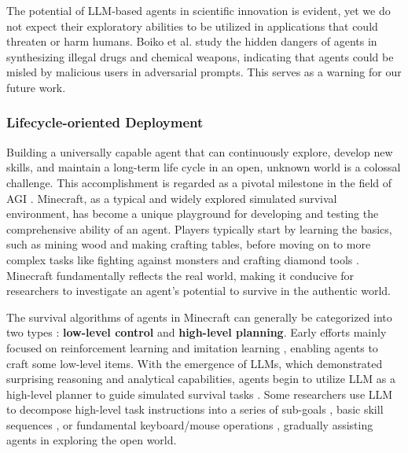 The potential of LLM-based agents in scientific innovation is evident, yet we do not expect their exploratory abilities to be utilized in applications that could threaten or harm humans. Boiko et al. \cite{DBLP:journals/corr/abs-2304-05332} study the hidden dangers of agents in synthesizing illegal drugs and chemical weapons, indicating that agents could be misled by malicious users in adversarial prompts. This serves as a warning for our future work.

\subsubsection{Lifecycle-oriented Deployment}\label{sec:Lifecycle-Oriented Deployment}
Building a universally capable agent that can continuously explore, develop new skills, and maintain a long-term life cycle in an open, unknown world is a colossal challenge. This accomplishment is regarded as a pivotal milestone in the field of AGI \cite{DBLP:journals/corr/abs-2302-01560}. Minecraft, as a typical and widely explored simulated survival environment, has become a unique playground for developing and testing the comprehensive ability of an agent. Players typically start by learning the basics, such as mining wood and making crafting tables, before moving on to more complex tasks like fighting against monsters and crafting diamond tools \cite{DBLP:journals/corr/abs-2305-16291}. Minecraft fundamentally reflects the real world, making it conducive for researchers to investigate an agent's potential to survive in the authentic world.

The survival algorithms of agents in Minecraft can generally be categorized into two types \cite{DBLP:journals/corr/abs-2305-16291}: \textbf{low-level control} and \textbf{high-level planning}. Early efforts mainly focused on reinforcement learning \cite{DBLP:journals/corr/abs-2305-16291, DBLP:journals/corr/abs-2211-00688} and imitation learning \cite{DBLP:journals/corr/abs-2007-02701}, enabling agents to craft some low-level items. With the emergence of LLMs, which demonstrated surprising reasoning and analytical capabilities, agents begin to utilize LLM as a high-level planner to guide simulated survival tasks \cite{DBLP:journals/corr/abs-2302-01560, DBLP:conf/icml/NottinghamAS0H023}. Some researchers use LLM to decompose high-level task instructions into a series of sub-goals \cite{DBLP:journals/corr/abs-2303-16563}, basic skill sequences \cite{DBLP:conf/icml/NottinghamAS0H023}, or fundamental keyboard/mouse operations \cite{DBLP:journals/corr/abs-2303-16563}, gradually assisting agents in exploring the open world.

